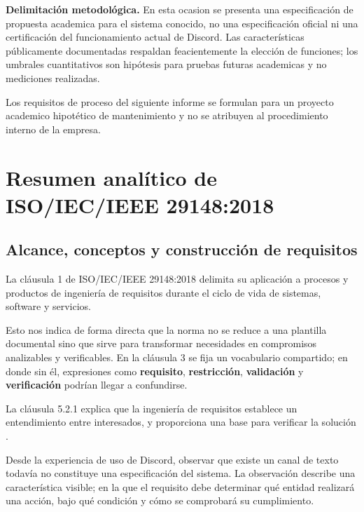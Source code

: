 \documentclass[12pt,a4paper]{article}
\begin{document}
\textbf{Delimitación metodológica.}
En esta ocasion se presenta una especificación de propuesta academica para el sistema conocido, no una especificación oficial ni una certificación del funcionamiento actual de Discord. Las características públicamente documentadas respaldan feacientemente la elección de funciones; los umbrales cuantitativos son hipótesis para pruebas futuras academicas y no mediciones realizadas.

Los requisitos de proceso del siguiente informe se formulan para un proyecto academico hipotético de mantenimiento y no se atribuyen al procedimiento interno de la empresa.


\section{Resumen analítico de ISO/IEC/IEEE 29148:2018}

\subsection{Alcance, conceptos y construcción de requisitos}

La cláusula 1 de ISO/IEC/IEEE 29148:2018 delimita su aplicación a procesos y productos de ingeniería de requisitos durante el ciclo de vida de sistemas, software y servicios.

Esto nos indica de forma directa que la norma no se reduce a una plantilla documental sino que sirve para transformar necesidades en compromisos analizables y verificables. En la cláusula 3 se  fija un vocabulario compartido; en donde sin él, expresiones como \textbf{requisito}, \textbf{restricción}, \textbf{validación} y \textbf{verificación} podrían llegar a confundirse.

La cláusula 5.2.1 explica que la ingeniería de requisitos establece un entendimiento entre interesados, y proporciona una base para verificar la solución \cite{iso29148}.

Desde la experiencia de uso de Discord, observar que existe un canal de texto todavía no constituye una especificación del sistema. La observación describe una característica visible; en la que el requisito debe determinar qué entidad realizará una acción, bajo qué condición y cómo se comprobará su cumplimiento.
\end{document}
